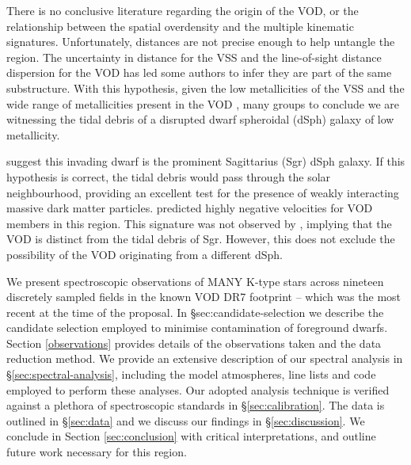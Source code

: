 \documentclass{emulateapj}
\begin{document}




There is no conclusive literature regarding the origin of the VOD, or the relationship between the spatial overdensity and the multiple kinematic signatures. Unfortunately, distances are not precise enough to help untangle the region. The uncertainty in distance for the VSS and the line-of-sight distance dispersion for the VOD has led some authors to infer they are part of the same substructure\citet{Duffau;et-al_2006, Newberg;et-al_2007, Prior;et-al_2009a}. With this hypothesis, given the low metallicities of the VSS \citep{Duffau;et-al_2006, Prior;et-al_2009a} and the wide range of metallicities present in the VOD \citep{Juric;et-al_2008}, many groups \citep{Duffau;et-al_2006, Martinez-Delgado;et-al_2007, Juric;et-al_2008} to conclude we are witnessing the tidal debris of a disrupted dwarf spheroidal (dSph) galaxy of low metallicity.


\citet{Martinez-Delgado;et-al_2007} suggest this invading dwarf is the prominent Sagittarius (Sgr) dSph galaxy. If this hypothesis is correct, the tidal debris would pass through the solar neighbourhood, providing an excellent test for the presence of weakly interacting massive dark matter particles. \citet{Martinez-Delgado;et-al_2007} predicted highly negative velocities for VOD members in this region. This signature was not observed by \citet{Newberg;et-al_2007}, implying that the VOD is distinct from the tidal debris of Sgr. However, this does not exclude the possibility of the VOD originating from a different dSph.

We present spectroscopic observations of MANY K-type stars across nineteen discretely sampled fields in the known VOD DR7 footprint \--- which was the most recent at the time of the proposal. In \S{sec:candidate-selection} we describe the candidate selection employed to minimise contamination of foreground dwarfs. Section \ref{observations} provides details of the observations taken and the data reduction method. We provide an extensive description of our spectral analysis in \S\ref{sec:spectral-analysis}, including the model atmospheres, line lists and code employed to perform these analyses. Our adopted analysis technique is verified against a plethora of spectroscopic standards in \S\ref{sec:calibration}. The data is outlined in \S\ref{sec:data} and we discuss our findings in \S\ref{sec:discussion}. We conclude in Section \ref{sec:conclusion} with critical interpretations, and outline future work necessary for this region.
\end{document}
